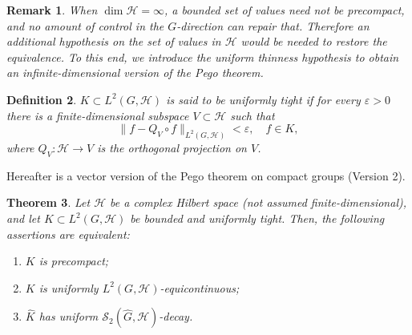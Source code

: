 \documentclass[11pt]{amsart}
\newtheorem{theorem}{Theorem}[section]
\newtheorem{definition}[theorem]{Definition}
\newtheorem{remark}[theorem]{Remark}
\begin{document}
\begin{remark}{\rm 
  When $\dim\mathcal{H}=\infty$, a bounded
set of values need not be precompact, and no amount of control in the $G$-direction
can repair that. Therefore an additional hypothesis on the  set of values in $\mathcal{H}$ would be
needed to restore the equivalence. To this end, we introduce the uniform thinness hypothesis to obtain an infinite-dimensional version of the Pego theorem. 
}\end{remark}

\begin{definition}\label{def:tight}
$K\subset L^2(G,\mathcal{H})$ is said to be uniformly tight if for every $\varepsilon>0$ there is a
finite-dimensional subspace $V\subset\mathcal{H}$ such that
$$
\|f - Q_V\circ f\|_{L^2(G,\mathcal{H})}<\varepsilon,\quad f\in K,
$$
where $Q_V:\mathcal{H}\to V$ is the orthogonal projection on $V$.
\end{definition}



Hereafter is a vector version of the Pego theorem on compact groups (Version 2).

\begin{theorem}\label{thm:main-tight}
Let $\mathcal{H}$ be a complex Hilbert space (not assumed finite-dimensional), and let
$K\subset L^2(G,\mathcal{H})$ be bounded and uniformly tight. Then, the following assertions are
equivalent:
\begin{enumerate}
\item[(i)] $K$ is precompact;
\item[(ii)] $K$ is uniformly
$L^2(G,\mathcal{H})$-equicontinuous;
\item[(iii)] $\widehat K$ has uniform $\mathscr{S}_2(\widehat{G},\mathcal{H})$-decay.
\end{enumerate} 
\end{theorem}
\end{document}
